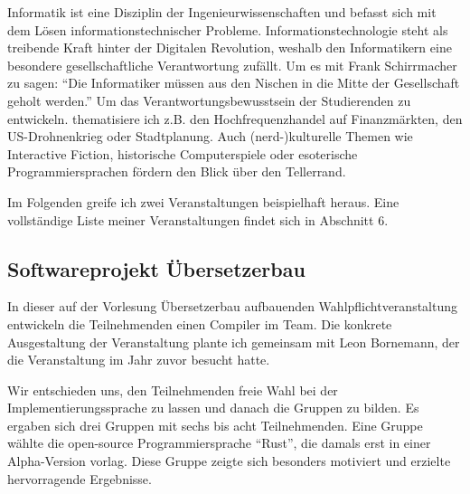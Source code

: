 \documentclass[11pt,ngerman]{article}
\begin{document}
Informatik ist eine Disziplin der Ingenieurwissenschaften und befasst sich mit dem Lösen informationstechnischer Probleme. Informationstechnologie steht als treibende Kraft hinter der Digitalen Revolution, weshalb den Informatikern eine besondere gesellschaftliche Verantwortung zufällt. Um es mit Frank Schirrmacher zu sagen: ``Die Informatiker müssen aus den Nischen in die Mitte der Gesellschaft geholt werden.'' Um das Verantwortungsbewusstsein der Studierenden zu entwickeln. thematisiere ich z.B. den Hochfrequenzhandel auf Finanzmärkten, den US-Drohnenkrieg oder Stadtplanung. Auch (nerd-)kulturelle Themen wie Interactive Fiction, historische Computerspiele oder esoterische Programmiersprachen fördern den Blick über den Tellerrand.
  
Im Folgenden greife ich zwei Veranstaltungen beispielhaft heraus. Eine vollständige Liste meiner Veranstaltungen findet sich in Abschnitt 6.

\subsection{Softwareprojekt Übersetzerbau}
In dieser auf der Vorlesung Übersetzerbau aufbauenden Wahlpflichtveranstaltung entwickeln die Teilnehmenden einen Compiler im Team. Die konkrete Ausgestaltung der Veranstaltung plante ich gemeinsam mit Leon Bornemann, der die Veranstaltung im Jahr zuvor besucht hatte. 

Wir entschieden uns, den Teilnehmenden freie Wahl bei der Implementierungssprache zu lassen und danach die Gruppen zu bilden. Es ergaben sich drei Gruppen mit sechs bis acht Teilnehmenden. Eine Gruppe wählte die open-source Programmiersprache ``Rust'', die damals erst in einer Alpha-Version vorlag. Diese Gruppe zeigte sich besonders motiviert und erzielte hervorragende Ergebnisse.
\end{document}
